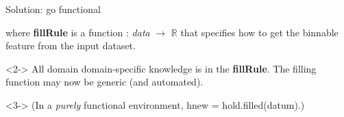 \documentclass[aspectratio=169]{beamer}
\begin{document}
\begin{frame}[fragile]{Solution: go functional}
\vspace{0.5 cm}
\begin{center}
\end{center}

where {\ttfamily\small\textbf{fillRule}} is a function : {\it data} $\to$ $\mathbb{R}$ that specifies how to get the binnable feature from the input dataset.

\begin{uncoverenv}<2->
\vspace{0.5 cm}
All domain domain-specific knowledge is in the {\ttfamily\small\textbf{fillRule}}. The filling function may now be generic (and automated).

\begin{center}
\end{center}
\end{uncoverenv}

\begin{uncoverenv}<3->
\vspace{0.5 cm}
(In a {\it purely} functional environment, {\ttfamily\small hnew = hold.filled(datum)}.)
\end{uncoverenv}
\end{frame}
\end{document}
